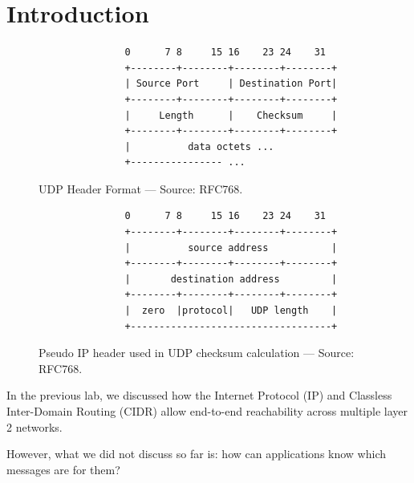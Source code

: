 \documentclass[pdftex,12pt,a4paper]{article}
\begin{document}
    \section{Introduction}
        \begin{figure}[tbh]
                    \begin{center}
                    \begin{verbatim}
               0      7 8     15 16    23 24    31
               +--------+--------+--------+--------+
               | Source Port     | Destination Port|
               +--------+--------+--------+--------+
               |     Length      |    Checksum     |
               +--------+--------+--------+--------+
               |          data octets ...
               +---------------- ...\end{verbatim}
            \end{center}
            \vspace{-15pt}
            \caption{UDP Header Format --- Source: RFC768.}
            \label{fig:udp}
            \vspace{10pt}
        \end{figure}

        \begin{figure}[tbh]
                    \begin{center}
                    \begin{verbatim}
               0      7 8     15 16    23 24    31
               +--------+--------+--------+--------+
               |          source address           |
               +--------+--------+--------+--------+
               |       destination address         |
               +--------+--------+--------+--------+
               |  zero  |protocol|   UDP length    |
               +-----------------------------------+\end{verbatim}
            \end{center}
            \vspace{-15pt}
            \caption{Pseudo IP header used in UDP checksum calculation ---
            Source: RFC768.}
            \label{fig:udpsip}
        \end{figure}

        In the previous lab, we discussed how the Internet Protocol (IP) and
        Classless Inter-Domain Routing (CIDR) allow end-to-end reachability
        across multiple layer 2 networks. 

        However, what we did not discuss so far is: how can applications know
        which messages are for them? 
        
\end{document}
